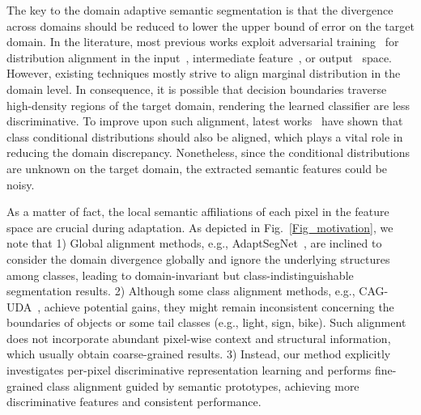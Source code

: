 \documentclass[runningheads]{llncs}
\begin{document}
The key to the domain adaptive semantic segmentation is that the divergence across domains should be reduced to lower the upper bound of error on the target domain. 
In the literature, most previous works exploit adversarial training~\cite{goodfellow2014gan} for distribution alignment in the input~\cite{li2019bidirectional,CycleGAN2017}, intermediate feature~\cite{hoffman2016fcns}, or output~\cite{tsai2018learning,liu2021bapa} space. However, existing techniques mostly strive to align marginal distribution in the domain level. In consequence, it is possible that decision boundaries traverse high-density regions of the target domain, rendering the learned classifier are less discriminative. To improve upon such alignment, latest works~\cite{chen2017crosscity,du2019ssf-dan,long2018conditional,luo2019taking,wang2020class,xie2018learning,ZhenWZLSSFQ20,zhang2019category} have shown that class conditional distributions should also be aligned, which plays a vital role in reducing the domain discrepancy. Nonetheless, since the conditional distributions are unknown on the target domain, the extracted semantic features could be noisy. 

As a matter of fact, the local semantic affiliations of each pixel in the feature space are crucial during adaptation. As depicted in Fig.~\ref{Fig_motivation}, we note that 1) Global alignment methods, e.g., AdaptSegNet~\cite{tsai2018learning}, are inclined to consider the domain divergence globally and ignore the underlying structures among classes, leading to domain-invariant but class-indistinguishable segmentation results. 2) Although some class alignment methods, e.g., CAG-UDA~\cite{zhang2019category}, achieve potential gains, they might remain inconsistent concerning the boundaries of objects or some tail classes (e.g., light, sign, bike). Such alignment does not incorporate abundant pixel-wise context and structural information, which usually obtain coarse-grained results. 3) Instead, our method explicitly investigates per-pixel discriminative representation learning and performs fine-grained class alignment guided by semantic prototypes, achieving more discriminative features and consistent performance.
\end{document}
